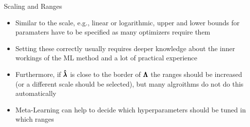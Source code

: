 \begin{frame}[allowframebreaks]{Scaling and Ranges}
\begin{figure}[htb]
\end{figure}

\framebreak

    \begin{itemize}
        \item Similar to the scale, e.g., linear or logarithmic, upper and lower bounds for paramaters have to be specified as many optimizers require them
        \item Setting these correctly usually requires deeper knowledge about the inner workings of the ML method and a lot of practical experience
        \item Furthermore, if $\pmb{\hat{\lambda}}$ is close to the border of $\pmb{\Lambda}$ the ranges should be increased (or a different scale should be selected), but many algroithms do not do this automatically
        \item Meta-Learning can help to decide which hyperparameters should be tuned in which ranges
    \end{itemize}

\end{frame}




